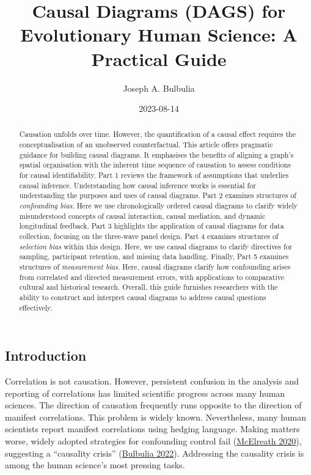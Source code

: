 \documentclass[
  singlecolumn]{article}
\title{Causal Diagrams (DAGS) for Evolutionary Human Science: A
Practical Guide}
\author{Joseph A. Bulbulia}
\affil{%
                  Victoria University of Wellington, New Zealand, School
                  of Psychology, Centre for Applied Cross-Cultural
                  Research
              }
\date{2023-08-14}
\begin{document}
\maketitle
\begin{abstract}
Causation unfolds over time. However, the quantification of a causal
effect requires the conceptualisation of an unobserved counterfactual.
This article offers pragmatic guidance for building causal diagrams. It
emphasises the benefits of aligning a graph's spatial organisation with
the inherent time sequence of causation to assess conditions for causal
identifiability. Part 1 reviews the framework of assumptions that
underlies causal inference. Understanding how causal inference works is
essential for understanding the purposes and uses of causal diagrams.
Part 2 examines structures of \emph{confounding bias}. Here we use
chronologically ordered causal diagrams to clarify widely misunderstood
concepts of causal interaction, causal mediation, and dynamic
longitudinal feedback. Part 3 highlights the application of causal
diagrams for data collection, focusing on the three-wave panel design.
Part 4 examines structures of \emph{selection bias} within this design.
Here, we use causal diagrams to clarify directives for sampling,
participant retention, and missing data handling. Finally, Part 5
examines structures of \emph{measurement bias}. Here, causal diagrams
clarify how confounding arises from correlated and directed measurement
errors, with applications to comparative cultural and historical
research. Overall, this guide furnishes researchers with the ability to
construct and interpret causal diagrams to address causal questions
effectively.
\end{abstract}
\ifdefined\Shaded\renewenvironment{Shaded}{\begin{tcolorbox}[enhanced, boxrule=0pt, frame hidden, interior hidden, sharp corners, borderline west={3pt}{0pt}{shadecolor}, breakable]}{\end{tcolorbox}}\fi

\hypertarget{introduction}{%
\subsection{Introduction}\label{introduction}}

Correlation is not causation. However, persistent confusion in the
analysis and reporting of correlations has limited scientific progress
across many human sciences. The direction of causation frequently runs
opposite to the direction of manifest correlations. This problem is
widely known. Nevertheless, many human scientists report manifest
correlations using hedging language. Making matters worse, widely
adopted strategies for confounding control fail
(\protect\hyperlink{ref-mcelreath2020}{McElreath 2020}), suggesting a
``causality crisis'' (\protect\hyperlink{ref-bulbulia2022}{Bulbulia
2022}). Addressing the causality crisis is among the human science's
most pressing tasks.
\end{document}
